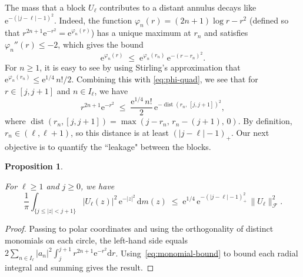 \documentclass[11pt]{amsart}
\newtheorem{proposition}[theorem]{Proposition}
\newtheorem{lemma}[theorem]{Lemma}
\theoremstyle{remark}
\begin{document}
The mass that a block $U_\ell$ contributes to a distant annulus decays
like $\mathrm{e}^{-(\lvert j-\ell \rvert-1)^2}$. Indeed, the function
$\varphi_n(r) = (2n{+}1)\log r - r^2$ (defined so that
$r^{2n+1}\mathrm{e}^{-r^2} = \mathrm{e}^{\varphi_n(r)}$) has a unique maximum at
$r_n$ and satisfies $\varphi_n''(r) \le -2$, which gives the
 bound
\begin{equation}\label{eq:phi-quad}
\mathrm{e}^{\varphi_n(r)}
\;\le\;
\mathrm{e}^{\varphi_n(r_n)}\, \mathrm{e}^{-(r - r_n)^2}.
\end{equation}
For $n \ge 1$, it is easy to see by using Stirling’s approximation that
$\mathrm{e}^{\varphi_n(r_n)} \le \mathrm{e}^{1/4}\, n!/2$.
Combining this with \eqref{eq:phi-quad},  we see that for $r \in
[j, j{+}1]$ and $n \in I_\ell$, we have
\begin{equation}\label{eq:monomial-bound}
r^{2n+1}\mathrm{e}^{-r^2}
\;\le\;
\frac{\mathrm{e}^{1/4}\, n!}{2}\,
\mathrm{e}^{-\operatorname{dist}(r_n,\,[j,j{+}1])^2},
\end{equation}
where $\operatorname{dist}(r_n, [j,j{+}1]) = \max(j - r_n,\, r_n - (j{+}1),\, 0)$.
By definition, $r_n \in (\ell, \ell{+}1)$, so this distance is at
least $(\lvert j - \ell \rvert - 1)_+$. Our next objective is to quantify the ``leakage" between the blocks.

\begin{proposition}\label{prop:single-leak}

For $\ell \ge 1$ and $j \ge 0$, we have
\[
\frac{1}{\pi}\int_{\{j \le \lvert z \rvert < j+1\}}
\lvert U_\ell(z) \rvert^2\, \mathrm{e}^{-\lvert z \rvert^2}\,\mathrm{d} m(z)
\;\le\;
\mathrm{e}^{1/4}\,
\mathrm{e}^{-(\lvert j-\ell \rvert-1)_+^2}\,
\lVert U_\ell \rVert_{\mathcal{F}}^2.
\]
\end{proposition}

\begin{proof}
Passing to polar coordinates and using the orthogonality of distinct
monomials on each circle, the left-hand side equals
$2\sum_{n \in I_\ell}\lvert a_n \rvert^2 \int_j^{j+1} r^{2n+1}\mathrm{e}^{-r^2}\mathrm{d} r$.
 Using~\eqref{eq:monomial-bound} to bound each radial integral  and summing gives the result.
\end{proof}
\end{document}
